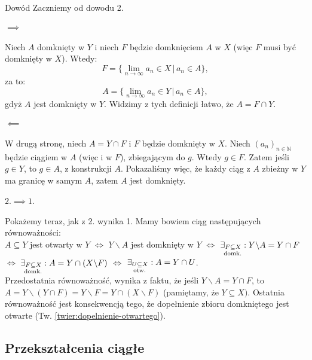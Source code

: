 \documentclass{article}
\newcounter{defi}
\numberwithin{defi}{section}
\numberwithin{theo}{section}
\numberwithin{defi}{section}
\newcommand{\N}{\mathbb{N}}
\newcommand{\oo}{\infty}
\newcommand{\subotw}{\underset{\clap{\scriptsize otw.}}{\subseteq}}
\newcommand{\subdomk}{\underset{\clap{\scriptsize domk.}}{\subseteq}}
\newcommand{\ciag}[1]{(#1_{n})_{n \in \N}}
\begin{document}
\begin{dow}{Dowód}
    Zaczniemy od dowodu 2.
    \paragraph{$\implies$} Niech $A$ domknięty w $Y$ i niech $F$ będzie domknięciem $A$ w $X$ (więc $F$ musi być domknięty w $X$). Wtedy: \begin{equation*}
        F = \{ \lim_{n \to \oo} a_n \in X \, \big| \, a_n \in A \},
    \end{equation*} za to:\begin{equation*}
        A = \{ \lim_{n \to \oo} a_n \in Y \, \big| \, a_n \in A \},
    \end{equation*}gdyż $A$ jest domknięty w $Y$. Widzimy z tych definicji łatwo, że $A = F \cap Y$.
    \paragraph{$\impliedby$} W drugą stronę, niech $A = Y \cap F$ i $F$ będzie domknięty w $X$. Niech $\ciag{a}$ będzie ciągiem w $A$ (więc i w $F$), zbiegającym do $g$. Wtedy $g \in F$. Zatem jeśli $g \in Y$, to $g \in A$, z konstrukcji $A$. Pokazaliśmy więc, że każdy ciąg z $A$ zbieżny w $Y$ ma granicę w samym $A$, zatem $A$ jest domknięty.
    \paragraph{$2. \implies 1.$} Pokażemy teraz, jak z 2. wynika 1. Mamy bowiem ciąg następujących równoważności: \\
    $A \subseteq Y$ jest otwarty w $Y$ $\iff$ $Y \backslash A$ jest domknięty w $Y$ $\iff$ $\exists_{F \subdomk X}: Y \backslash A = Y \cap F$ $\iff$ $ \exists_{F \subdomk X}: A = Y \cap (X \backslash F)$ $\iff$ $\exists_{U \subotw X}: A = Y \cap U$.\\
    Przedostatnia równoważność, wynika z faktu, że jeśli $Y \backslash A = Y \cap F$, to $A = Y \backslash (Y \cap F) = Y \backslash F =Y \cap (X \backslash F)$ (pamiętamy, że $Y\subseteq X)$.
    Ostatnia równoważność jest konsekwencją tego, że dopełnienie zbioru domkniętego jest otwarte (Tw. \ref{twier:dopelnienie-otwartego}).
\end{dow}

\subsection{Przekształcenia ciągłe}
\end{document}
